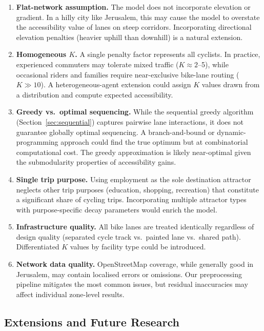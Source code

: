\documentclass[12pt,a4paper]{article}
\begin{document}
\begin{enumerate}[leftmargin=*]
    \item \textbf{Flat-network assumption.} The model does not incorporate elevation or gradient. In a hilly city like Jerusalem, this may cause the model to overstate the accessibility value of lanes on steep corridors. Incorporating directional elevation penalties (heavier uphill than downhill) is a natural extension.

    \item \textbf{Homogeneous $K$.} A single penalty factor represents all cyclists. In practice, experienced commuters may tolerate mixed traffic ($K \approx 2$--5), while occasional riders and families require near-exclusive bike-lane routing ($K \gg 10$). A heterogeneous-agent extension could assign $K$ values drawn from a distribution and compute expected accessibility.

    \item \textbf{Greedy vs.\ optimal sequencing.} While the sequential greedy algorithm (Section~\ref{sec:sequential}) captures pairwise lane interactions, it does not guarantee globally optimal sequencing. A branch-and-bound or dynamic-programming approach could find the true optimum but at combinatorial computational cost. The greedy approximation is likely near-optimal given the submodularity properties of accessibility gains.

    \item \textbf{Single trip purpose.} Using employment as the sole destination attractor neglects other trip purposes (education, shopping, recreation) that constitute a significant share of cycling trips. Incorporating multiple attractor types with purpose-specific decay parameters would enrich the model.

    \item \textbf{Infrastructure quality.} All bike lanes are treated identically regardless of design quality (separated cycle track vs.\ painted lane vs.\ shared path). Differentiated $K$ values by facility type could be introduced.

    \item \textbf{Network data quality.} OpenStreetMap coverage, while generally good in Jerusalem, may contain localised errors or omissions. Our preprocessing pipeline mitigates the most common issues, but residual inaccuracies may affect individual zone-level results.
\end{enumerate}

\subsection{Extensions and Future Research}
\end{document}
